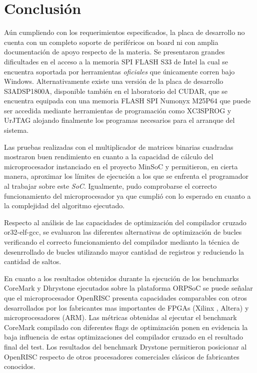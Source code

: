 \section{Conclusión}
 Aún cumpliendo con los requerimientos especificados, la placa de desarrollo no cuenta con un completo soporte de periféricos on board ni con amplia
 documentación de apoyo respecto de la materia. Se presentaron grandes dificultades en el acceso a la memoria SPI FLASH S33 de Intel la cual se
 encuentra soportada por herramientas \textit{oficiales} que únicamente corren bajo Windows. Alternativamente existe una versión de la placa de
 desarrollo S3ADSP1800A, disponible también en el laboratorio del CUDAR, que se encuentra equipada con una memoria FLASH SPI Numonyx M25P64 que puede
 ser accedida mediante herramientas de programación como XC3SPROG y UrJTAG alojando finalmente los programas necesarios para el arranque del sistema.

Las pruebas realizadas con el multiplicador de matrices binarias cuadradas mostraron buen rendimiento en cuanto a la capacidad de cálculo del
microprocesador instanciado en el proyecto MinSoC y permitieron, en cierta manera, aproximar los límites de ejecución a los que se enfrenta el
programador al trabajar sobre este \textit{SoC}. Igualmente, pudo comprobarse el correcto funcionamiento del microprocesador ya que cumplió con lo
esperado en cuanto a la complejidad del algoritmo ejecutado.

Respecto al análisis de las capacidades de optimización del compilador cruzado or32-elf-gcc, se evaluaron las diferentes alternativas de
optimización de bucles verificando el correcto funcionamiento del compilador medianto la técnica de desenrrollado de bucles utilizando mayor cantidad
de registros y reduciendo la cantidad de saltos.
	
En cuanto a los resultados obtenidos durante la ejecución de los benchmarks CoreMark y Dhrystone ejecutados sobre la plataforma ORPSoC se puede
señalar que el microprocesador OpenRISC presenta capacidades comparables con otros desarrollados por los fabricantes mas importantes de
FPGAs (Xilinx , Altera) y microprocesadores (ARM). Las métricas obtenidas al ejecutar el benchmark CoreMark compilado con diferentes flags de
optimización ponen en evidencia la baja influencia de estas optimizaciones del compilador cruzado en el resultado final del test. Los resultados del
benchmark Drystone permitieron posicionar al OpenRISC respecto de otros procesadores comerciales clásicos de fabricantes conocidos.
	
